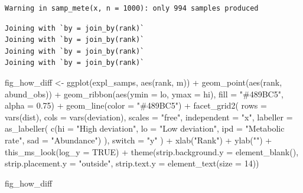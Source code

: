 \documentclass[
  letterpaper,
  DIV=11,
  numbers=noendperiod]{scrartcl}
\newenvironment{Shaded}{\begin{snugshade}}{\end{snugshade}}
\newcommand{\AttributeTok}[1]{\textcolor[rgb]{0.40,0.45,0.13}{#1}}
\newcommand{\ConstantTok}[1]{\textcolor[rgb]{0.56,0.35,0.01}{#1}}
\newcommand{\DecValTok}[1]{\textcolor[rgb]{0.68,0.00,0.00}{#1}}
\newcommand{\FloatTok}[1]{\textcolor[rgb]{0.68,0.00,0.00}{#1}}
\newcommand{\FunctionTok}[1]{\textcolor[rgb]{0.28,0.35,0.67}{#1}}
\newcommand{\NormalTok}[1]{\textcolor[rgb]{0.00,0.23,0.31}{#1}}
\newcommand{\OtherTok}[1]{\textcolor[rgb]{0.00,0.23,0.31}{#1}}
\newcommand{\SpecialCharTok}[1]{\textcolor[rgb]{0.37,0.37,0.37}{#1}}
\newcommand{\StringTok}[1]{\textcolor[rgb]{0.13,0.47,0.30}{#1}}
\begin{document}
\begin{verbatim}
Warning in samp_mete(x, n = 1000): only 994 samples produced
\end{verbatim}

\begin{verbatim}
Joining with `by = join_by(rank)`
Joining with `by = join_by(rank)`
Joining with `by = join_by(rank)`
Joining with `by = join_by(rank)`
\end{verbatim}

\begin{Shaded}
\begin{Highlighting}[]
\NormalTok{fig\_how\_diff }\OtherTok{\textless{}{-}} \FunctionTok{ggplot}\NormalTok{(expl\_samps, }\FunctionTok{aes}\NormalTok{(rank, m)) }\SpecialCharTok{+}
    \FunctionTok{geom\_point}\NormalTok{(}\FunctionTok{aes}\NormalTok{(rank, abund\_obs)) }\SpecialCharTok{+}
    \FunctionTok{geom\_ribbon}\NormalTok{(}\FunctionTok{aes}\NormalTok{(}\AttributeTok{ymin =}\NormalTok{ lo, }\AttributeTok{ymax =}\NormalTok{ hi), }
                \AttributeTok{fill =} \StringTok{"\#489BC5"}\NormalTok{, }\AttributeTok{alpha =} \FloatTok{0.75}\NormalTok{) }\SpecialCharTok{+}
    \FunctionTok{geom\_line}\NormalTok{(}\AttributeTok{color =} \StringTok{"\#489BC5"}\NormalTok{) }\SpecialCharTok{+}
    \FunctionTok{facet\_grid2}\NormalTok{(}
        \AttributeTok{rows =} \FunctionTok{vars}\NormalTok{(dist), }\AttributeTok{cols =} \FunctionTok{vars}\NormalTok{(deviation), }
        \AttributeTok{scales =} \StringTok{"free"}\NormalTok{, }\AttributeTok{independent =} \StringTok{"x"}\NormalTok{, }
        \AttributeTok{labeller =} \FunctionTok{as\_labeller}\NormalTok{(}
            \FunctionTok{c}\NormalTok{(}\AttributeTok{hi =} \StringTok{"High deviation"}\NormalTok{, }\AttributeTok{lo =} \StringTok{"Low deviation"}\NormalTok{, }
              \AttributeTok{ipd =} \StringTok{"Metabolic rate"}\NormalTok{, }\AttributeTok{sad =} \StringTok{"Abundance"}\NormalTok{)}
\NormalTok{        ), }
        \AttributeTok{switch =} \StringTok{"y"}
\NormalTok{    ) }\SpecialCharTok{+}
    \FunctionTok{xlab}\NormalTok{(}\StringTok{"Rank"}\NormalTok{) }\SpecialCharTok{+}
    \FunctionTok{ylab}\NormalTok{(}\StringTok{""}\NormalTok{) }\SpecialCharTok{+}
    \FunctionTok{this\_ms\_look}\NormalTok{(}\AttributeTok{log\_y =} \ConstantTok{TRUE}\NormalTok{) }\SpecialCharTok{+}
    \FunctionTok{theme}\NormalTok{(}\AttributeTok{strip.background.y =} \FunctionTok{element\_blank}\NormalTok{(), }
          \AttributeTok{strip.placement.y =} \StringTok{"outside"}\NormalTok{,}
          \AttributeTok{strip.text.y =} \FunctionTok{element\_text}\NormalTok{(}\AttributeTok{size =} \DecValTok{14}\NormalTok{))}

\NormalTok{fig\_how\_diff}
\end{Highlighting}
\end{Shaded}
\end{document}

